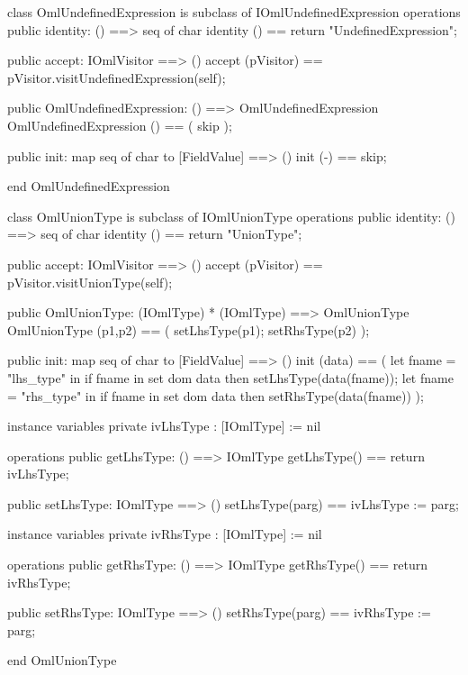 \begin{vdm_al}
class OmlUndefinedExpression is subclass of IOmlUndefinedExpression
operations
  public identity: () ==> seq of char
  identity () == return "UndefinedExpression";

  public accept: IOmlVisitor ==> ()
  accept (pVisitor) == pVisitor.visitUndefinedExpression(self);

  public OmlUndefinedExpression:
      () ==> OmlUndefinedExpression
  OmlUndefinedExpression () == 
    ( skip );

  public init: map seq of char to [FieldValue] ==> ()
  init (-) == skip;

end OmlUndefinedExpression
\end{vdm_al}

\begin{vdm_al}
class OmlUnionType is subclass of IOmlUnionType
operations
  public identity: () ==> seq of char
  identity () == return "UnionType";

  public accept: IOmlVisitor ==> ()
  accept (pVisitor) == pVisitor.visitUnionType(self);

  public OmlUnionType:
      (IOmlType) *
      (IOmlType) ==> OmlUnionType
  OmlUnionType (p1,p2) == 
   ( setLhsType(p1);
     setRhsType(p2) );

  public init: map seq of char to [FieldValue] ==> ()
  init (data) ==
    ( let fname = "lhs_type" in
        if fname in set dom data
        then setLhsType(data(fname));
      let fname = "rhs_type" in
        if fname in set dom data
        then setRhsType(data(fname)) );

instance variables
  private ivLhsType : [IOmlType] := nil

operations
  public getLhsType: () ==> IOmlType
  getLhsType() == return ivLhsType;

  public setLhsType: IOmlType ==> ()
  setLhsType(parg) == ivLhsType := parg;

instance variables
  private ivRhsType : [IOmlType] := nil

operations
  public getRhsType: () ==> IOmlType
  getRhsType() == return ivRhsType;

  public setRhsType: IOmlType ==> ()
  setRhsType(parg) == ivRhsType := parg;

end OmlUnionType
\end{vdm_al}

